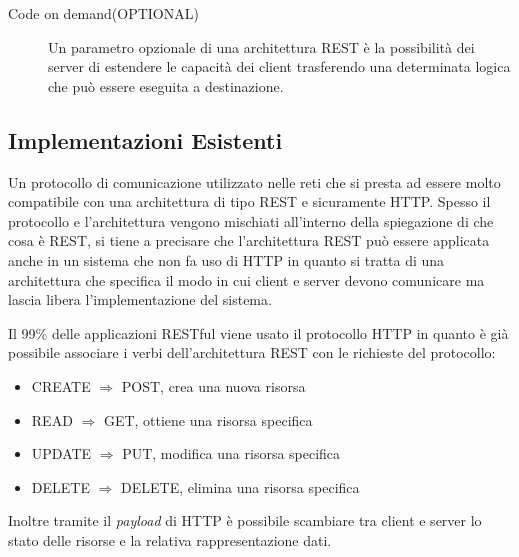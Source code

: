 \begin{description}
\item[Code on demand(OPTIONAL)]

Un parametro opzionale di una architettura REST è la possibilità dei server di estendere le capacità dei client trasferendo una determinata logica che può essere eseguita a destinazione.

\end{description}



\subsection{Implementazioni Esistenti}

Un protocollo di comunicazione utilizzato nelle reti che si presta ad essere molto compatibile con una architettura di tipo REST e sicuramente HTTP. Spesso il protocollo e l'architettura vengono mischiati all'interno della spiegazione di che cosa è REST, si tiene a precisare che l'architettura REST può essere applicata anche in un sistema che non fa uso di HTTP in quanto si tratta di una architettura che specifica il modo in cui client e server devono comunicare ma lascia libera l'implementazione del sistema.

Il 99\% delle applicazioni RESTful viene usato il protocollo HTTP in quanto è già possibile associare i verbi dell'architettura REST con le richieste del protocollo: 
\begin{itemize}
\item CREATE $\Rightarrow$ POST, crea una nuova risorsa

\item READ   $\Rightarrow$ GET, ottiene una risorsa specifica

\item UPDATE $\Rightarrow$ PUT, modifica una risorsa specifica

\item DELETE $\Rightarrow$ DELETE, elimina una risorsa specifica

\end{itemize}
Inoltre tramite il \emph{payload} di HTTP è possibile scambiare tra client e server lo stato delle risorse e la relativa rappresentazione dati.

